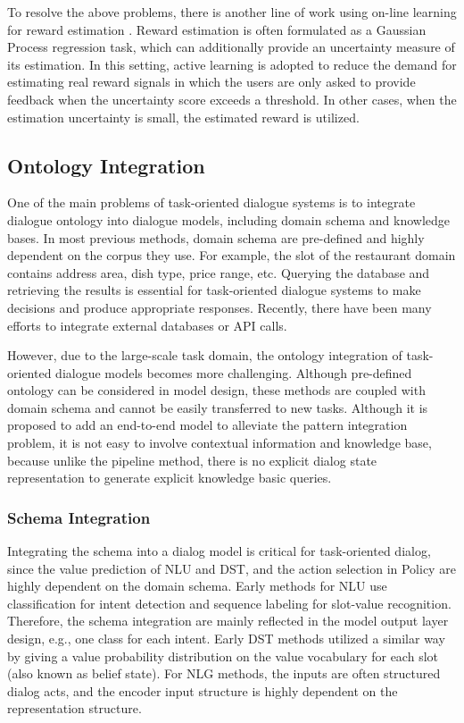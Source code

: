 \documentclass[10pt,twocolumn,letterpaper]{article}
\begin{document}
To resolve the above problems, there is another line of work using on-line learning for reward estimation \cite{su2016line}. Reward estimation is often formulated as a Gaussian Process regression task, which can additionally provide an uncertainty measure of its estimation. In this setting, active learning is adopted to reduce the demand for estimating real reward signals in which the users are only asked to provide feedback when the uncertainty score exceeds a threshold. In other cases, when the estimation uncertainty is small, the estimated reward is utilized.
\subsection{Ontology Integration}
One of the main problems of task-oriented dialogue systems is to integrate dialogue ontology into dialogue models, including domain schema and knowledge bases. In most previous methods, domain schema are pre-defined and highly dependent on the corpus they use. For example, the slot of the restaurant domain contains address area, dish type, price range, etc. Querying the database and retrieving the results is essential for task-oriented dialogue systems to make decisions and produce appropriate responses. Recently, there have been many efforts to integrate external databases or API calls.

However, due to the large-scale task domain, the ontology integration of task-oriented dialogue models becomes more challenging. Although pre-defined ontology can be considered in model design, these methods are coupled with domain schema and cannot be easily transferred to new tasks. Although it is proposed to add an end-to-end model to alleviate the pattern integration problem, it is not easy to involve contextual information and knowledge base, because unlike the pipeline method, there is no explicit dialog state representation to generate explicit knowledge basic queries.
\subsubsection{Schema Integration}

Integrating the schema into a dialog model is critical for task-oriented dialog, since the value prediction of NLU and DST, and  the action selection in Policy are highly  dependent  on the domain schema.  Early methods for NLU use classification for intent detection and sequence labeling for slot-value recognition. Therefore, the schema integration are mainly reflected in the model output layer design, e.g., one class for each intent. Early DST methods utilized a similar way by giving a value  probability distribution on the value  vocabulary for each slot (also  known  as  belief  state). For NLG methods, the inputs are often structured dialog acts, and the encoder input structure is highly dependent on the representation structure.
\end{document}
